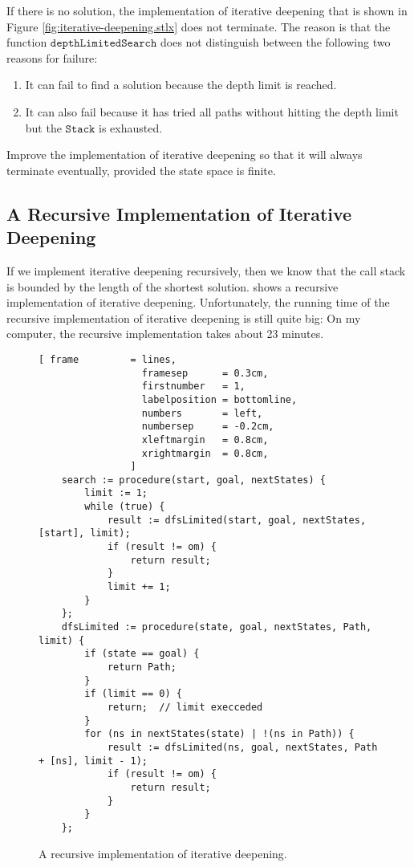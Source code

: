 \exercise
If there is no solution, the implementation of iterative deepening that is shown in Figure
\ref{fig:iterative-deepening.stlx} does not terminate.  The reason is that the function $\mathtt{depthLimitedSearch}$ does not
distinguish between the following two reasons for failure:
\begin{enumerate}
\item It can fail to find a solution because the depth limit is reached.
\item It can also fail because it has tried all paths without hitting the depth limit but the $\mathtt{Stack}$ is exhausted.
\end{enumerate}
Improve the implementation of iterative deepening so that it will always terminate eventually, provided the
state space is finite.
\eoxs

\subsection{A Recursive Implementation of Iterative Deepening}
If we implement iterative deepening recursively, then we know that the call stack is bounded by the length of
the shortest solution.  
shows a recursive implementation of iterative deepening.
Unfortunately, the running time of the recursive implementation of iterative deepening is still
quite big:  On my computer, the recursive implementation takes about 23 minutes.


\begin{figure}[!ht]
\centering
\begin{Verbatim}[ frame         = lines,
                  framesep      = 0.3cm,
                  firstnumber   = 1,
                  labelposition = bottomline,
                  numbers       = left,
                  numbersep     = -0.2cm,
                  xleftmargin   = 0.8cm,
                  xrightmargin  = 0.8cm,
                ]
    search := procedure(start, goal, nextStates) {
        limit := 1;
        while (true) {
            result := dfsLimited(start, goal, nextStates, [start], limit);
            if (result != om) {
                return result;
            }
            limit += 1;
        }
    };
    dfsLimited := procedure(state, goal, nextStates, Path, limit) {
        if (state == goal) {
            return Path;
        }
        if (limit == 0) {
            return;  // limit execceded
        }
        for (ns in nextStates(state) | !(ns in Path)) {
            result := dfsLimited(ns, goal, nextStates, Path + [ns], limit - 1);
            if (result != om) {
                return result;
            }
        }
    };
\end{Verbatim}
\vspace*{-0.3cm}
\caption{A recursive implementation of iterative deepening.}
\label{fig:iterative-deepening-recursive.stlx}
\end{figure}

